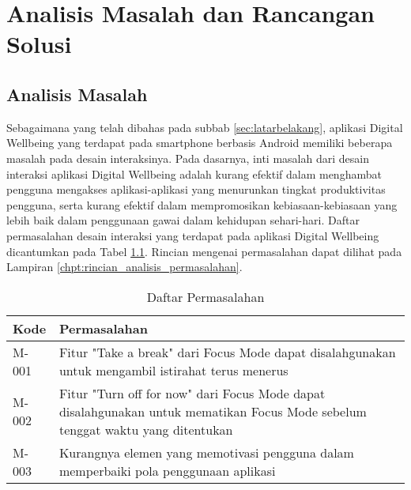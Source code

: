 \chapter{Analisis Masalah dan Rancangan Solusi}



\section{Analisis Masalah}
\label{sec:analisis_masalah}

Sebagaimana yang telah dibahas pada subbab \ref{sec:latarbelakang}, aplikasi Digital Wellbeing yang terdapat pada smartphone berbasis Android memiliki beberapa masalah pada desain interaksinya. Pada dasarnya, inti masalah dari desain interaksi aplikasi Digital Wellbeing adalah kurang efektif dalam menghambat pengguna mengakses aplikasi-aplikasi yang menurunkan tingkat produktivitas pengguna, serta kurang efektif dalam mempromosikan kebiasaan-kebiasaan yang lebih baik dalam penggunaan gawai dalam kehidupan sehari-hari. Daftar permasalahan desain interaksi yang terdapat pada aplikasi Digital Wellbeing dicantumkan pada Tabel \ref{tab:daftar_permasalahan}. Rincian mengenai permasalahan dapat dilihat pada Lampiran \ref{chpt:rincian_analisis_permasalahan}.

\begin{table}[ht]
  \centering
  \fontsize{10}{12}
  \caption{Daftar Permasalahan}
  \label{tab:daftar_permasalahan}
  \vspace{0.2cm}
  \begin{tabular}{|p{}|p{}|}
  \hline
  Kode  & Permasalahan                                                                                                                    \\ \hline
  M-001 & Fitur "Take a break" dari Focus Mode dapat disalahgunakan untuk mengambil istirahat terus menerus                               \\ \hline
  M-002 & Fitur "Turn off for now" dari Focus Mode dapat disalahgunakan untuk mematikan Focus Mode sebelum tenggat waktu yang ditentukan  \\ \hline
  M-003 & Kurangnya elemen yang memotivasi pengguna dalam memperbaiki pola penggunaan aplikasi                                            \\ \hline
  \end{tabular}
\end{table}


